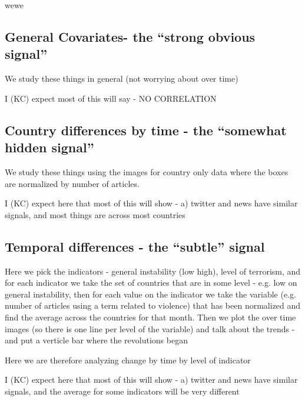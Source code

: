 wewe
\subsection{General Covariates- the ``strong obvious signal''}

We study these things in general (not worrying about over time) 

I (KC) expect most of this will say - NO CORRELATION


\subsection{Country differences by time - the ``somewhat hidden signal''}

We study these things using the images for country only data where the boxes are normalized by number of articles.

I (KC) expect here that most of this will show - a) twitter and news have similar signals, and most things are across most countries 

\subsection{Temporal differences - the ``subtle'' signal}
 
Here we pick the indicators - general instability (low high), level of
terrorism, and for each indicator we take the set of countries that are
in some level - e.g. low on general instability, then for each value on
the indicator we take the variable (e.g. number of articles using a term related to violence) that has been normalized and find the average across the countries for that month.  Then we plot the over time images (so there is one line per level of the variable) and talk about the trends - and put a verticle bar where the revolutions began

Here we are therefore analyzing change by time by level of indicator 

I (KC) expect here that most of this will show - a) twitter and news have similar signals, and the average for some indicators will be very different

